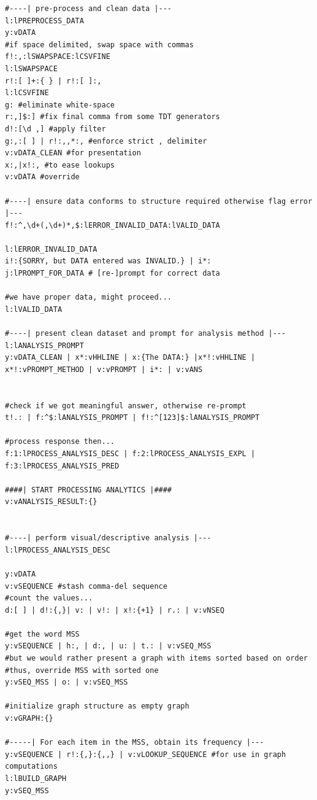 \documentclass[a4paper, 18pt]{book} %
\begin{document}
{\begin{tcolorbox}[teaterminalstyle, title=TEA Program:  Statistical Analysis Tool (SAT), breakable]
\begin{lstlisting}[language=TEA,breaklines=true,]
#----| pre-process and clean data |---
l:lPREPROCESS_DATA
y:vDATA
#if space delimited, swap space with commas
f!:,:lSWAPSPACE:lCSVFINE
l:lSWAPSPACE
r!:[ ]+:{ } | r!:[ ]:,
l:lCSVFINE
g: #eliminate white-space
r:,]$:] #fix final comma from some TDT generators
d!:[\d ,] #apply filter
g:,:[ ] | r!:,,*:, #enforce strict , delimiter
v:vDATA_CLEAN #for presentation
x:,|x!:, #to ease lookups
v:vDATA #override

#----| ensure data conforms to structure required otherwise flag error |---
f!:^,\d+(,\d+)*,$:lERROR_INVALID_DATA:lVALID_DATA

l:lERROR_INVALID_DATA
i!:{SORRY, but DATA entered was INVALID.} | i*:
j:lPROMPT_FOR_DATA # [re-]prompt for correct data

#we have proper data, might proceed...
l:lVALID_DATA

#----| present clean dataset and prompt for analysis method |---
l:lANALYSIS_PROMPT
y:vDATA_CLEAN | x*:vHHLINE | x:{The DATA:} |x*!:vHHLINE | x*!:vPROMPT_METHOD | v:vPROMPT | i*: | v:vANS


#check if we got meaningful answer, otherwise re-prompt
t!.: | f:^$:lANALYSIS_PROMPT | f!:^[123]$:lANALYSIS_PROMPT

#process response then...
f:1:lPROCESS_ANALYSIS_DESC | f:2:lPROCESS_ANALYSIS_EXPL | f:3:lPROCESS_ANALYSIS_PRED

####| START PROCESSING ANALYTICS |####
v:vANALYSIS_RESULT:{}


#----| perform visual/descriptive analysis |---
l:lPROCESS_ANALYSIS_DESC

y:vDATA
v:vSEQUENCE #stash comma-del sequence
#count the values...
d:[ ] | d!:{,}| v: | v!: | x!:{+1} | r.: | v:vNSEQ

#get the word MSS
y:vSEQUENCE | h:, | d:, | u: | t.: | v:vSEQ_MSS
#but we would rather present a graph with items sorted based on order
#thus, override MSS with sorted one
y:vSEQ_MSS | o: | v:vSEQ_MSS

#initialize graph structure as empty graph
v:vGRAPH:{}

#-----| For each item in the MSS, obtain its frequency |---
y:vSEQUENCE | r!:{,}:{,,} | v:vLOOKUP_SEQUENCE #for use in graph computations
l:lBUILD_GRAPH
y:vSEQ_MSS


\end{lstlisting}
\end{tcolorbox}}
\end{document}
